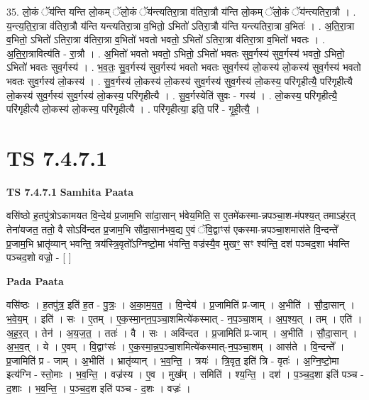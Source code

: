 \documentclass[17pt]{extarticle}
\begin{document}
35. लो॒कं ॅय॑न्ति यन्ति लो॒कम् ॅलो॒कं ॅय॑न्त्यतिरा॒त्रा व॑तिरा॒त्रौ य॑न्ति लो॒कम् ॅलो॒कं ॅय॑न्त्यतिरा॒त्रौ । . य॒न्त्य॒ति॒रा॒त्रा व॑तिरा॒त्रौ य॑न्ति यन्त्यतिरा॒त्रा व॒भितो॒ ऽभितो॑ ऽतिरा॒त्रौ य॑न्ति यन्त्यतिरा॒त्रा व॒भितः॑ । . अ॒ति॒रा॒त्रा व॒भितो॒ ऽभितो॑ ऽतिरा॒त्रा व॑तिरा॒त्रा व॒भितो॑ भवतो भवतो॒ ऽभितो॑ ऽतिरा॒त्रा व॑तिरा॒त्रा व॒भितो॑ भवतः । . अ॒ति॒रा॒त्रावित्य॑ति - रा॒त्रौ । . अ॒भितो॑ भवतो भवतो॒ ऽभितो॒ ऽभितो॑ भवतः सुव॒र्गस्य॑ सुव॒र्गस्य॑ भवतो॒ ऽभितो॒ ऽभितो॑ भवतः सुव॒र्गस्य॑ । . भ॒व॒तः॒ सु॒व॒र्गस्य॑ सुव॒र्गस्य॑ भवतो भवतः सुव॒र्गस्य॑ लो॒कस्य॑ लो॒कस्य॑ सुव॒र्गस्य॑ भवतो भवतः सुव॒र्गस्य॑ लो॒कस्य॑ । . सु॒व॒र्गस्य॑ लो॒कस्य॑ लो॒कस्य॑ सुव॒र्गस्य॑ सुव॒र्गस्य॑ लो॒कस्य॒ परि॑गृहीत्यै॒ परि॑गृहीत्यै लो॒कस्य॑ सुव॒र्गस्य॑ सुव॒र्गस्य॑ लो॒कस्य॒ परि॑गृहीत्यै । . सु॒व॒र्गस्येति॑ सुवः - गस्य॑ । . लो॒कस्य॒ परि॑गृहीत्यै॒ परि॑गृहीत्यै लो॒कस्य॑ लो॒कस्य॒ परि॑गृहीत्यै । . परि॑गृहीत्या॒ इति॒ परि॑ - गृ॒ही॒त्यै॒ । \newline
\pagebreak
{}

\section{ TS 7.4.7.1 }

\textbf{TS 7.4.7.1 } \newline
\textbf{Samhita Paata} \newline

वसि॑ष्ठो ह॒तपु॑त्रोऽकामयत वि॒न्देय॑ प्र॒जाम॒भि सा॑दा॒सान् भ॑वेय॒मिति॒ स ए॒तमे॑कस्मा-न्नपञ्चा॒श-म॑पश्य॒त् तमाऽह॑र॒त् तेना॑यजत॒ ततो॒ वै सोऽवि॑न्दत प्र॒जाम॒भि सौ॑दा॒सान॑भव॒द्य ए॒वं ॅवि॒द्वाꣳस॑ एकस्मा-न्नपञ्चा॒शमास॑ते वि॒न्दन्ते᳚ प्र॒जाम॒भि भ्रातृ॑व्यान् भवन्ति॒ त्रय॑स्त्रि॒वृतो᳚ऽग्निष्टो॒मा भ॑वन्ति॒ वज्र॑स्यै॒व मुखꣳ॒॒ सꣳ श्य॑न्ति॒ दश॑ पञ्चद॒शा भ॑वन्ति पञ्चद॒शो वज्रो॒ - [  ] \newline

\textbf{Pada Paata} \newline

वसि॑ष्ठः । ह॒तपु॑त्र॒ इति॑ ह॒त - पु॒त्रः॒ । अ॒का॒म॒य॒त॒ । वि॒न्देय॑ । प्र॒जामिति॑ प्र-जाम् । अ॒भीति॑ । सौ॒दा॒सान् । भ॒वे॒य॒म् । इति॑ । सः । ए॒तम् । ए॒क॒स्मा॒न्‌न॒प॒ञ्चा॒शमित्ये॑कस्मात् - न॒प॒ञ्चा॒शम् । अ॒प॒श्य॒त् । तम् । एति॑ । अ॒ह॒र॒त् । तेन॑ । अ॒य॒ज॒त॒ । ततः॑ । वै । सः । अवि॑न्दत । प्र॒जामिति॑ प्र-जाम् । अ॒भीति॑ । सौ॒दा॒सान् । अ॒भ॒व॒त् । ये । ए॒वम् । वि॒द्वाꣳसः॑ । ए॒क॒स्मा॒न्न॒प॒ञ्चा॒शमित्ये॑कस्मात्-न॒प॒ञ्चा॒शम् । आस॑ते । वि॒न्दन्ते᳚ । प्र॒जामिति॑ प्र - जाम् । अ॒भीति॑ । भ्रातृ॑व्यान् । भ॒व॒न्ति॒ । त्रयः॑ । त्रि॒वृत॒ इति॑ त्रि - वृतः॑ । अ॒ग्नि॒ष्टो॒मा इत्य॑ग्नि - स्तो॒माः । भ॒व॒न्ति॒ । वज्र॑स्य । ए॒व । मुख᳚म् । समिति॑ । श्य॒न्ति॒ । दश॑ । प॒ञ्च॒द॒शा इति॑ पञ्च - द॒शाः । भ॒व॒न्ति॒ । प॒ञ्च॒द॒श इति॑ पञ्च - द॒शः । वज्रः॑ ।  \newline
\end{document}
